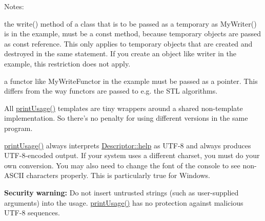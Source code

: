 \begin{DoxyParagraph}{\-Notes\-:}
\begin{DoxyItemize}
\item the {\ttfamily write()} method of a class that is to be passed as a temporary as {\ttfamily \-My\-Writer()} is in the example, must be a {\ttfamily const} method, because temporary objects are passed as const reference. \-This only applies to temporary objects that are created and destroyed in the same statement. \-If you create an object like {\ttfamily writer} in the example, this restriction does not apply. \item a functor like {\ttfamily \-My\-Write\-Functor} in the example must be passed as a pointer. \-This differs from the way functors are passed to e.\-g. the \-S\-T\-L algorithms. \item \-All \hyperlink{namespaceoption_afc8bb7e040a98a0b33ff1ce9da1be0d1}{print\-Usage()} templates are tiny wrappers around a shared non-\/template implementation. \-So there's no penalty for using different versions in the same program. \item \hyperlink{namespaceoption_afc8bb7e040a98a0b33ff1ce9da1be0d1}{print\-Usage()} always interprets \hyperlink{structoption_1_1_descriptor_a9045b19311533e1b8a08645d57149c79}{\-Descriptor\-::help} as \-U\-T\-F-\/8 and always produces \-U\-T\-F-\/8-\/encoded output. \-If your system uses a different charset, you must do your own conversion. \-You may also need to change the font of the console to see non-\/\-A\-S\-C\-I\-I characters properly. \-This is particularly true for \-Windows. \item {\bfseries \-Security} {\bfseries warning\-:} \-Do not insert untrusted strings (such as user-\/supplied arguments) into the usage. \hyperlink{namespaceoption_afc8bb7e040a98a0b33ff1ce9da1be0d1}{print\-Usage()} has no protection against malicious \-U\-T\-F-\/8 sequences.\end{DoxyItemize}

\end{DoxyParagraph}

